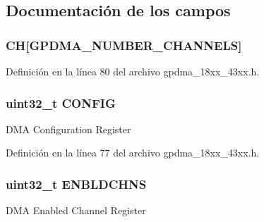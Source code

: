 \subsection{Documentación de los campos}
\subsubsection[{\texorpdfstring{CH}{CH}}]{ CH\mbox{[}{\bf G\+P\+D\+M\+A\+\_\+\+N\+U\+M\+B\+E\+R\+\_\+\+C\+H\+A\+N\+N\+E\+LS}\mbox{]}}\hypertarget{struct_l_p_c___g_p_d_m_a___t_a63c87a432cbd36e189189ae8eadbc29d}{}\label{struct_l_p_c___g_p_d_m_a___t_a63c87a432cbd36e189189ae8eadbc29d}


Definición en la línea 80 del archivo gpdma\+\_\+18xx\+\_\+43xx.\+h.

\subsubsection[{\texorpdfstring{C\+O\+N\+F\+IG}{CONFIG}}]{ uint32\+\_\+t C\+O\+N\+F\+IG}\hypertarget{struct_l_p_c___g_p_d_m_a___t_aed40378e2ce292435df51ff247d0cb78}{}\label{struct_l_p_c___g_p_d_m_a___t_aed40378e2ce292435df51ff247d0cb78}
D\+MA Configuration Register 

Definición en la línea 77 del archivo gpdma\+\_\+18xx\+\_\+43xx.\+h.

\subsubsection[{\texorpdfstring{E\+N\+B\+L\+D\+C\+H\+NS}{ENBLDCHNS}}]{ uint32\+\_\+t E\+N\+B\+L\+D\+C\+H\+NS}\hypertarget{struct_l_p_c___g_p_d_m_a___t_ab6cf4f9f7ccf99f86aa31e7799860648}{}\label{struct_l_p_c___g_p_d_m_a___t_ab6cf4f9f7ccf99f86aa31e7799860648}
D\+MA Enabled Channel Register 

